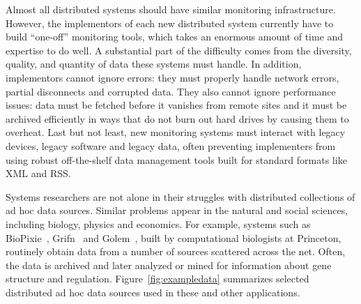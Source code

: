 Almost all distributed systems should have similar
monitoring infrastructure.  However, the implementors of each new
distributed system currently have to build ``one-off'' monitoring tools,
which takes an enormous amount of time and expertise to do well.  A
substantial part of the difficulty comes from the diversity, quality,
and quantity of data these systems must handle.  In addition,
implementors cannot ignore errors: they must properly handle network 
errors, partial disconnects and corrupted data.  They also cannot ignore 
performance issues:
data must be fetched before it vanishes from remote sites and it must
be archived efficiently in ways that do not burn out hard drives by
causing them to overheat.  Last but not least, new monitoring systems 
must interact with legacy devices, legacy software and legacy data,
often preventing implementers from using robust off-the-shelf data management
tools built for standard formats like XML and RSS. 

Systems researchers are not alone in their struggles with distributed
collections of ad hoc data sources.
Similar problems appear in the natural and social sciences,
including biology, physics and economics.  For example, systems such
as BioPixie~\cite{biopixie}, Grifn~\cite{grifn} and
Golem~\cite{golem}, built by computational biologists at Princeton,
routinely obtain data from a number of sources scattered
across the net.  Often, the data is archived and later analyzed or
mined for information about gene structure and regulation.
Figure~\ref{fig:exampledata} summarizes 
selected distributed ad hoc data sources used in these and other
applications.


